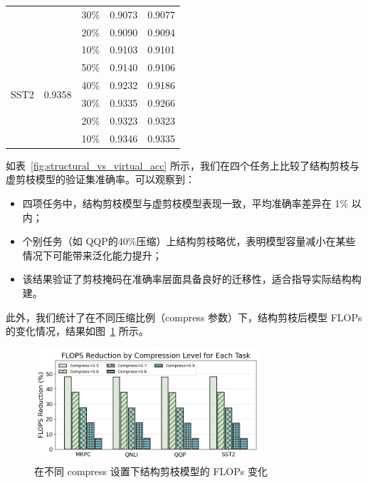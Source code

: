 \documentclass[UTF8,openany]{ctexbook}
\begin{document}
\begin{table}[htbp]
\begin{tabular}{lcccc}
         &                         & 30\% & \cellcolor{lightgray}0.9073 & \cellcolor{darkgray}0.9077 \\
         &                         & 20\% & \cellcolor{lightgray}0.9090 & \cellcolor{darkgray}0.9094 \\
         &                         & 10\% & \cellcolor{lightgray}0.9103 & \cellcolor{darkgray}0.9101 \\
    \midrule
    \multirow{4}{*}{SST2} 
         & \multirow{4}{*}{0.9358} & 50\% & \cellcolor{lightgray}0.9140 & \cellcolor{darkgray}0.9106 \\
         &                         & 40\% & \cellcolor{lightgray}0.9232 & \cellcolor{darkgray}0.9186 \\
         &                         & 30\% & \cellcolor{lightgray}0.9335 & \cellcolor{darkgray}0.9266 \\
         &                         & 20\% & \cellcolor{lightgray}0.9323 & \cellcolor{darkgray}0.9323 \\
         &                         & 10\% & \cellcolor{lightgray}0.9346 & \cellcolor{darkgray}0.9335 \\
    \bottomrule
    \end{tabular}
\end{table}

如表~\ref{fig:structural_vs_virtual_acc} 所示，我们在四个任务上比较了结构剪枝与虚剪枝模型的验证集准确率。可以观察到：

\begin{itemize}[itemsep=0pt, topsep=0pt, parsep=0pt, partopsep=0pt]
    \item 四项任务中，结构剪枝模型与虚剪枝模型表现一致，平均准确率差异在 1\% 以内；
    \item 个别任务（如 QQP的40\%压缩）上结构剪枝略优，表明模型容量减小在某些情况下可能带来泛化能力提升；
    \item 该结果验证了剪枝掩码在准确率层面具备良好的迁移性，适合指导实际结构构建。
\end{itemize}

此外，我们统计了在不同压缩比例（compress 参数）下，结构剪枝后模型 FLOPs 的变化情况，结果如图~\ref{fig:structural_flops_trend} 所示。

\begin{figure}[H]
    \centering
    \includegraphics[width=0.75\textwidth]{img/cutModelFLops.png}
    \caption{在不同 compress 设置下结构剪枝模型的 FLOPs 变化}
    \label{fig:structural_flops_trend}
\end{figure}
\end{document}
